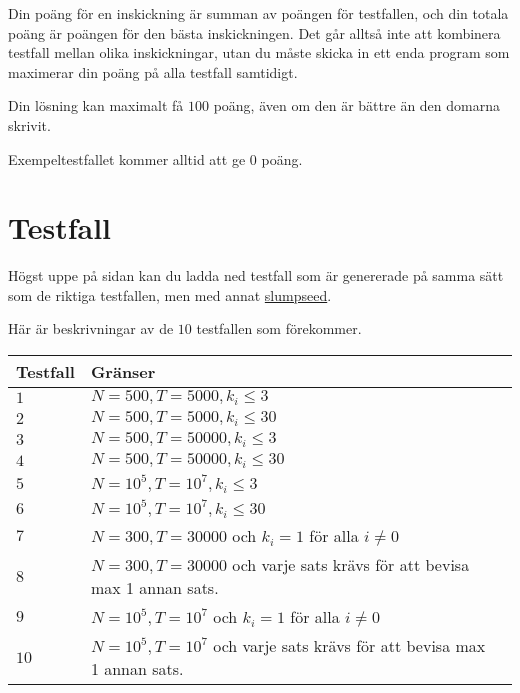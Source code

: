 Din poäng för en inskickning är summan av poängen för testfallen, och din totala poäng är poängen för den bästa inskickningen.
Det går alltså inte att kombinera testfall mellan olika inskickningar, utan du måste skicka in ett enda program som
maximerar din poäng på alla testfall samtidigt.

Din lösning kan maximalt få $100$ poäng, även om den är bättre än den domarna skrivit.

Exempeltestfallet kommer alltid att ge $0$ poäng.

\section*{Testfall}
Högst uppe på sidan kan du ladda ned testfall som är genererade på samma sätt som de riktiga testfallen,
men med annat \href{https://en.wikipedia.org/wiki/Random_seed}{slumpseed}.

Här är beskrivningar av de $10$ testfallen som förekommer.

\noindent
\begin{tabular}{| l | l | l |}
\hline
Testfall & Gränser  \\ \hline
$1$       & $N=500,T=5000,k_i \le 3$  \\ \hline
$2$       & $N=500,T=5000,k_i \le 30$  \\ \hline
$3$       & $N=500,T=50000,k_i \le 3$  \\ \hline
$4$       & $N=500,T=50000,k_i \le 30$  \\ \hline
$5$       & $N=10^5,T=10^7,k_i \le 3$  \\ \hline
$6$       & $N=10^5,T=10^7,k_i \le 30$  \\ \hline
$7$       & $N=300,T=30000$ och $k_i=1$ för alla $i\neq0$\\ \hline
$8$       & $N=300,T=30000$ och varje sats krävs för att bevisa max 1 annan sats. \\ \hline
$9$       & $N=10^5,T=10^7$ och $k_i=1$ för alla $i\neq0$ \\ \hline
$10$      & $N=10^5,T=10^7$ och varje sats krävs för att bevisa max 1 annan sats.  \\ \hline
\end{tabular}
